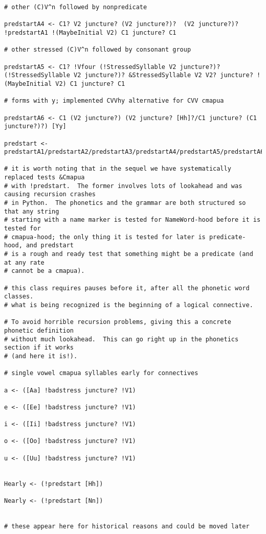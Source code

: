 \documentclass[12pt]{book}
\begin{document}
{\begin{verbatim}
# other (C)V^n followed by nonpredicate 

predstartA4 <- C1? V2 juncture? (V2 juncture?)?  (V2 juncture?)? !predstartA1 !(MaybeInitial V2) C1 juncture? C1

# other stressed (C)V^n followed by consonant group

predstartA5 <- C1? !Vfour (!StressedSyllable V2 juncture?)? (!StressedSyllable V2 juncture?)? &StressedSyllable V2 V2? juncture? !(MaybeInitial V2) C1 juncture? C1

# forms with y; implemented CVVhy alternative for CVV cmapua

predstartA6 <- C1 (V2 juncture?) (V2 juncture? [Hh]?/C1 juncture? (C1 juncture?)?) [Yy]

predstart <- predstartA1/predstartA2/predstartA3/predstartA4/predstartA5/predstartA6

# it is worth noting that in the sequel we have systematically replaced tests &Cmapua
# with !predstart.  The former involves lots of lookahead and was causing recursion crashes
# in Python.  The phonetics and the grammar are both structured so that any string
# starting with a name marker is tested for NameWord-hood before it is tested for 
# cmapua-hood; the only thing it is tested for later is predicate-hood, and predstart
# is a rough and ready test that something might be a predicate (and at any rate
# cannot be a cmapua).

# this class requires pauses before it, after all the phonetic word classes.
# what is being recognized is the beginning of a logical connective.

# To avoid horrible recursion problems, giving this a concrete phonetic definition
# without much lookahead.  This can go right up in the phonetics section if it works
# (and here it is!).

# single vowel cmapua syllables early for connectives

a <- ([Aa] !badstress juncture? !V1)

e <- ([Ee] !badstress juncture? !V1)

i <- ([Ii] !badstress juncture? !V1)

o <- ([Oo] !badstress juncture? !V1)

u <- ([Uu] !badstress juncture? !V1)


Hearly <- (!predstart [Hh])

Nearly <- (!predstart [Nn])


# these appear here for historical reasons and could be moved later



\end{verbatim}}
\end{document}
